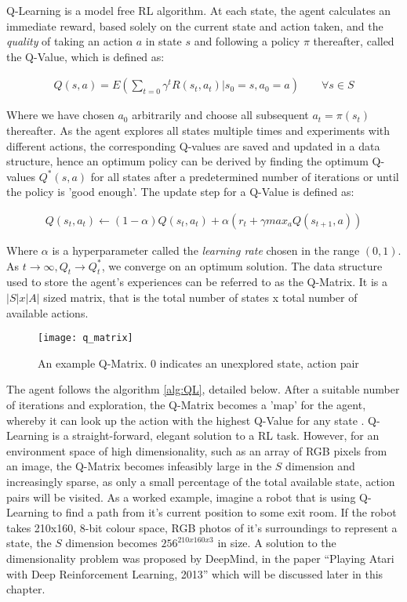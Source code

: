 Q-Learning is a model free RL algorithm. At each state, the agent calculates an immediate reward,
based solely on the current state and action taken, and the \textit{quality} of taking an action $a$
in state $s$ and following a policy $\pi$ thereafter, called the Q-Value, which is defined as:

\begin{gather*}
    Q(s, a) = E(\sum_{t=0}\gamma^tR(s_t, a_t) | s_0 = s, a_0 = a) \qquad \forall s \in S
\end{gather*}

Where we have chosen $a_0$ arbitrarily and
choose all subsequent $a_t = \pi(s_t)$ thereafter. As the agent explores all states multiple times
and experiments with different actions, the corresponding Q-values are saved and updated in a data
structure, hence an optimum policy can be derived by finding the optimum Q-values $Q^*(s, a)$ for all states after a predetermined number of iterations or until the policy is 'good enough'. The update step for a Q-Value is defined as:

\begin{align*}
    Q(s_t, a_t) \leftarrow (1-\alpha)Q(s_t, a_t) + \alpha(r_t + \gamma max_aQ(s_{t+1}, a))
\end{align*}

Where $\alpha$ is a hyperparameter called the \textit{learning rate} chosen in the range $(0, 1)$. As $t \rightarrow \infty, Q_t \rightarrow Q^*_t$, we converge on an optimum solution. The data structure used to store the agent's experiences can be referred to as the Q-Matrix. It is a
$|S| x |A|$ sized matrix, that is the total number of states x total number of available actions.

\begin{figure}[h]
    \texttt{[image: q\_matrix]}
    \centering
    \caption{An example Q-Matrix. 0 indicates an unexplored state, action pair}
\end{figure}

The agent follows the algorithm \ref{alg:QL}, detailed below.
After a suitable number of iterations and exploration, the Q-Matrix becomes a 'map' for the agent,
whereby it can look up the action with the highest Q-Value for any state \cite{qlearning}.
Q-Learning is a straight-forward, elegant solution to a RL task. However, for an environment space
of high dimensionality, such as an array of RGB pixels from an image, the Q-Matrix becomes
infeasibly large in the $S$ dimension and increasingly sparse, as only a small percentage of the
total available state, action pairs will be visited. As a worked example, imagine a robot that is
using Q-Learning to find a path from it's current position to some exit room. If the robot takes
210x160, 8-bit colour space, RGB photos of it's surroundings to represent a state, the $S$ dimension
becomes $256^{210x160x3}$ in size. A solution to the dimensionality problem was
proposed by DeepMind, in the paper ``Playing Atari with Deep Reinforcement Learning, 2013''
\cite{deepmind1} which will be discussed later in this chapter.

